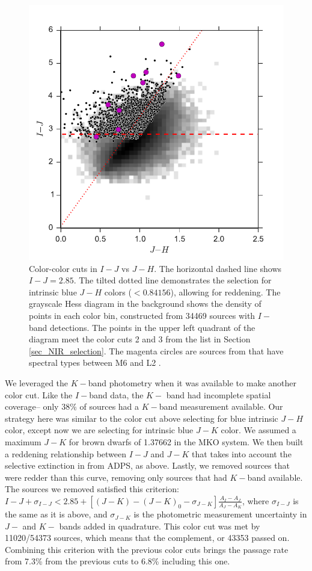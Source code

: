 \documentclass[12pt,preprint]{aastex}
\begin{document}
\begin{figure}[ht!]
  \caption{Color-color cuts in $I-J$ vs $J-H$. The horizontal dashed line shows $I-J=2.85$.  The tilted dotted line demonstrates the selection for intrinsic blue $J-H$ colors ($<0.84156$), allowing for reddening.  The grayscale Hess diagram in the background shows the density of points in each color bin, constructed from 34469 sources with $I-$band detections.  The points in the upper left quadrant of the diagram meet the color cuts 2 and 3 from the list in Section \ref{sec_NIR_selection}.  The magenta circles are sources from \citet{allers06} that have spectral types between M6 and L2 \citep{2011ASPC..448..633G}.\label{fig_NIR_selection_JH}}
\centering
\includegraphics[scale=0.6]{figures/NIR_selection_allers_M6_L2}
\end{figure}

We leveraged the $K-$band photometry when it was available to make another color cut.  Like the $I-$band data, the $K-$ band had incomplete spatial coverage-- only 38\% of sources had a $K-$band measurement available.  Our strategy here was similar to the color cut above selecting for blue intrinsic $J-H$ color, except now we are selecting for intrinsic blue $J-K$ color.  We assumed a maximum $J-K$ for brown dwarfs of 1.37662 in the MKO system.  We then built a reddening relationship between $I-J$ and $J-K$ that takes into account the selective extinction in from ADPS, as above.  Lastly, we removed sources that were redder than this curve, removing only sources that had $K-$band available.  The sources we removed satisfied this criterion:  $I-J + \sigma_{I-J} < 2.85 + [(J-K) - (J-K)_0 - \sigma_{J-K}]\frac{A_I-A_J}{A_J - A_K}$, where $\sigma_{I-J}$ is the same as it is above, and $\sigma_{J-K}$ is the photometric measurement uncertainty in $J-$ and $K-$ bands added in quadrature.  This color cut was met by 11020/54373 sources, which means that the complement, or 43353 passed on.  Combining this criterion with the previous color cuts brings the passage rate from 7.3\% from the previous cuts to 6.8\% including this one.
\end{document}

